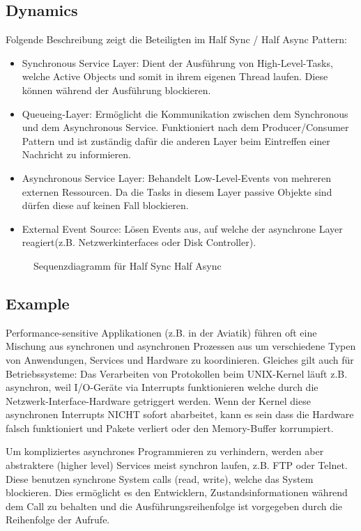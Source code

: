 \subsection{Dynamics}
Folgende Beschreibung zeigt die Beteiligten im Half Sync / Half Async Pattern:
\begin{itemize}
  \item Synchronous Service Layer: Dient der Ausführung von High-Level-Tasks, welche Active Objects und somit in ihrem eigenen Thread laufen. Diese können während der Ausführung blockieren.
  \item Queueing-Layer: Ermöglicht die Kommunikation zwischen dem Synchronous und dem Asynchronous Service. Funktioniert nach dem Producer/Consumer Pattern und ist zuständig dafür die anderen Layer beim Eintreffen einer Nachricht zu informieren.
  \item Asynchronous Service Layer: Behandelt Low-Level-Events von mehreren externen Ressourcen. Da die Tasks in diesem Layer passive Objekte sind dürfen diese auf keinen Fall blockieren.
  \item External Event Source: Lösen Events aus, auf welche der asynchrone Layer reagiert(z.B. Netzwerkinterfaces oder Disk Controller).
\end{itemize}
\begin{figure}[H]
  \centering
  
  \caption{Sequenzdiagramm f\"ur Half Sync Half Async}
\end{figure}
\subsection{Example}
Performance-sensitive Applikationen (z.B. in der Aviatik) führen oft eine Mischung aus synchronen und asynchronen Prozessen aus um verschiedene Typen von Anwendungen, Services und Hardware zu koordinieren. Gleiches gilt auch für Betriebssysteme: Das Verarbeiten von Protokollen beim UNIX-Kernel läuft z.B. asynchron, weil I/O-Geräte via Interrupts funktionieren welche durch die Netzwerk-Interface-Hardware getriggert werden. Wenn der Kernel diese asynchronen Interrupts NICHT sofort abarbeitet, kann es sein dass die Hardware falsch funktioniert und Pakete verliert oder den Memory-Buffer korrumpiert.

Um kompliziertes asynchrones Programmieren zu verhindern, werden aber abstraktere (higher level) Services meist synchron laufen, z.B. FTP oder Telnet. Diese benutzen synchrone System calls (read, write), welche das System blockieren. Dies ermöglicht es den Entwicklern, Zustandsinformationen während dem Call zu behalten und die Ausführungsreihenfolge ist vorgegeben durch die Reihenfolge der Aufrufe.

